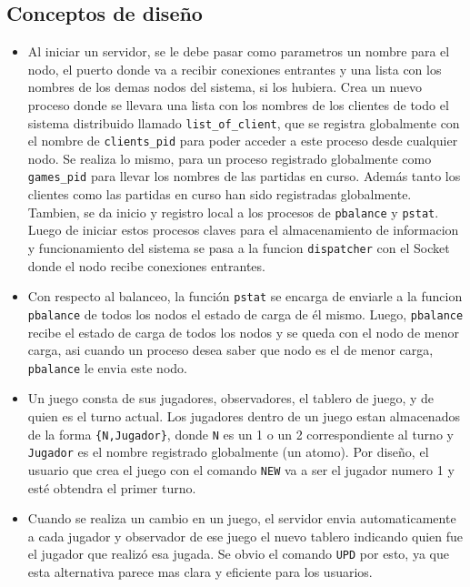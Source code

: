 \documentclass[a4paper]{article}
\newcommand{\blacktr}[0]{\item[$\blacktriangleright$]}
\begin{document}
\subsection*{Conceptos de diseño}
\begin{itemize}
  \blacktr Al iniciar un servidor, se le debe pasar como parametros un nombre para el nodo, el puerto donde va a recibir conexiones entrantes y una lista con los nombres de los demas nodos del sistema, si los hubiera. Crea un nuevo proceso donde se llevara una lista con los nombres de los clientes de todo el sistema distribuido llamado \texttt{list_of_client}, que se registra globalmente con el nombre de \texttt{clients_pid} para poder acceder a este proceso desde cualquier nodo. Se realiza lo mismo, para un proceso registrado globalmente como \texttt{games_pid} para llevar los nombres de las partidas en curso. Además tanto los clientes como las partidas en curso han sido registradas globalmente. Tambien, se da inicio y registro local a los procesos de \texttt{pbalance} y \texttt{pstat}. Luego de iniciar estos procesos claves para el almacenamiento de informacion y funcionamiento del sistema se pasa a la funcion \texttt{dispatcher} con el Socket donde el nodo recibe conexiones entrantes.
  \blacktr Con respecto al balanceo, la función \texttt{pstat} se encarga de enviarle a la funcion \texttt{pbalance} de todos los nodos el estado de carga de él mismo. Luego, \texttt{pbalance} recibe el estado de carga de todos los nodos y se queda con el nodo de menor carga, asi cuando un proceso desea saber que nodo es el de menor carga, \texttt{pbalance} le envia este nodo.
  \blacktr Un juego consta de sus jugadores, observadores, el tablero de juego, y de quien es el turno actual. Los jugadores dentro de un juego estan almacenados de la forma \texttt{\{N,Jugador\}}, donde \texttt{N} es un 1 o un 2 correspondiente al turno y \texttt{Jugador} es el nombre registrado globalmente (un atomo). Por diseño, el usuario que crea el juego con el comando \texttt{NEW} va a ser el jugador numero 1 y esté obtendra el primer turno.
  \blacktr Cuando se realiza un cambio en un juego, el servidor envia automaticamente a cada jugador y observador de ese juego el nuevo tablero indicando quien fue el jugador que realizó esa jugada. Se obvio el comando \texttt{UPD} por esto, ya que esta alternativa parece mas clara y eficiente para los usuarios. 



\end{itemize}
\end{document}
